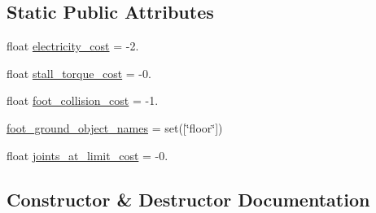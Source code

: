 \subsection*{Static Public Attributes}
\begin{DoxyCompactItemize}
\item 
float \hyperlink{classpybullet-gym_1_1pybulletgym_1_1envs_1_1mujoco_1_1envs_1_1locomotion_1_1walker__base__env_1_1_walker_base_mu_jo_co_env_a0412402e7454cd6ec2987bcc5492a490}{electricity\+\_\+cost} = -\/2.
\item 
float \hyperlink{classpybullet-gym_1_1pybulletgym_1_1envs_1_1mujoco_1_1envs_1_1locomotion_1_1walker__base__env_1_1_walker_base_mu_jo_co_env_a22e95dfa555edfe54a9e2b2ff51ac11d}{stall\+\_\+torque\+\_\+cost} = -\/0.
\item 
float \hyperlink{classpybullet-gym_1_1pybulletgym_1_1envs_1_1mujoco_1_1envs_1_1locomotion_1_1walker__base__env_1_1_walker_base_mu_jo_co_env_a04039fad978931650f404173dfb6af86}{foot\+\_\+collision\+\_\+cost} = -\/1.
\item 
\hyperlink{classpybullet-gym_1_1pybulletgym_1_1envs_1_1mujoco_1_1envs_1_1locomotion_1_1walker__base__env_1_1_walker_base_mu_jo_co_env_a0916ad4e52f8e7b02527c6a818682ac3}{foot\+\_\+ground\+\_\+object\+\_\+names} = set(\mbox{[}\char`\"{}floor\char`\"{}\mbox{]})
\item 
float \hyperlink{classpybullet-gym_1_1pybulletgym_1_1envs_1_1mujoco_1_1envs_1_1locomotion_1_1walker__base__env_1_1_walker_base_mu_jo_co_env_a81dfe77f91b71363bb570a862eef15d4}{joints\+\_\+at\+\_\+limit\+\_\+cost} = -\/0.
\end{DoxyCompactItemize}


\subsection{Constructor \& Destructor Documentation}
